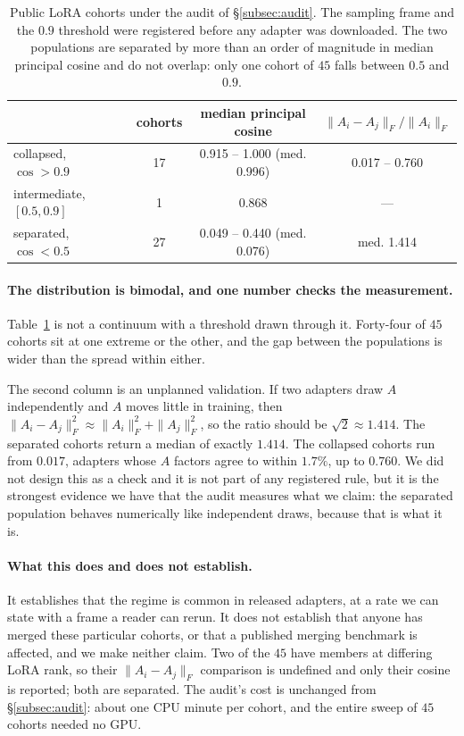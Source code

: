 \begin{table}[tb]
\centering
\small
\caption{Public LoRA cohorts under the audit of \S\ref{subsec:audit}. The
sampling frame and the $0.9$ threshold were registered before any adapter was
downloaded. The two populations are separated by more than an order of
magnitude in median principal cosine and do not overlap: only one cohort of
$45$ falls between $0.5$ and $0.9$.}
\label{tab:prevalence}
\begin{tabular}{lccc}
\toprule
 & cohorts & median principal cosine & $\|A_i - A_j\|_F/\|A_i\|_F$ \\
\midrule
collapsed, $\cos > 0.9$      & 17 & 0.915 -- 1.000 (med. 0.996) & 0.017 -- 0.760 \\
intermediate, $[0.5, 0.9]$   & 1  & 0.868 & --- \\
separated, $\cos < 0.5$      & 27 & 0.049 -- 0.440 (med. 0.076) & med. 1.414 \\
\bottomrule
\end{tabular}
\end{table}

\paragraph{The distribution is bimodal, and one number checks the
measurement.} Table~\ref{tab:prevalence} is not a continuum with a threshold
drawn through it. Forty-four of $45$ cohorts sit at one extreme or the other,
and the gap between the populations is wider than the spread within either.

The second column is an unplanned validation. If two adapters draw $A$
independently and $A$ moves little in training, then
$\|A_i - A_j\|_F^2 \approx \|A_i\|_F^2 + \|A_j\|_F^2$, so the ratio should be
$\sqrt 2 \approx 1.414$. The separated cohorts return a median of exactly
$1.414$. The collapsed cohorts run from $0.017$, adapters whose $A$ factors
agree to within $1.7\%$, up to $0.760$. We did not design this as a check and
it is not part of any registered rule, but it is the strongest evidence we have
that the audit measures what we claim: the separated population behaves
numerically like independent draws, because that is what it is.

\paragraph{What this does and does not establish.} It establishes that the
regime is common in released adapters, at a rate we can state with a frame a
reader can rerun. It does not establish that anyone has merged these particular
cohorts, or that a published merging benchmark is affected, and we make neither
claim. Two of the $45$ have members at differing LoRA rank, so their
$\|A_i - A_j\|_F$ comparison is undefined and only their cosine is reported;
both are separated. The audit's cost is unchanged from
\S\ref{subsec:audit}: about one CPU minute per cohort, and the entire sweep of
$45$ cohorts needed no GPU.

